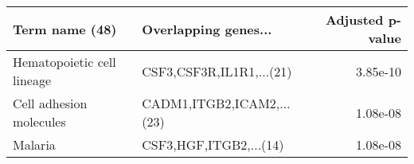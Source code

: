\begin{tabular}{llr}
\toprule
            Term name (48) &      Overlapping genes... &  Adjusted p-value \\
\midrule
Hematopoietic cell lineage &  CSF3,CSF3R,IL1R1,...(21) &          3.85e-10 \\
   Cell adhesion molecules & CADM1,ITGB2,ICAM2,...(23) &          1.08e-08 \\
                   Malaria &    CSF3,HGF,ITGB2,...(14) &          1.08e-08 \\
\bottomrule
\end{tabular}
